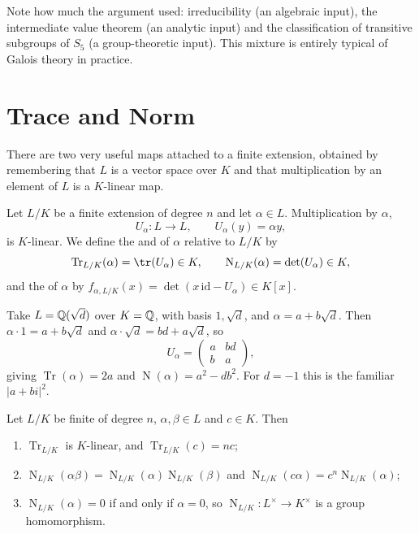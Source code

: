 \documentclass[a4paper]{scrartcl}
\newcommand{\Tr}{\operatorname{Tr}}
\newcommand{\Nm}{\operatorname{N}}
\begin{document}
\begin{remark}
	Note how much the argument used: irreducibility (an algebraic input), the intermediate value theorem (an analytic input) and the classification of transitive subgroups of $S_5$ (a group-theoretic input). This mixture is entirely typical of Galois theory in practice.
\end{remark}

\section{Trace and Norm}\label{sec:tracenorm}

There are two very useful maps attached to a finite extension, obtained by remembering that $L$ is a vector space over $K$ and that multiplication by an element of $L$ is a $K$-linear map.

\begin{definition}
	Let $L/K$ be a finite extension of degree $n$ and let $\alpha \in L$. Multiplication by $\alpha$,
	$$U_\alpha : L \to L, \qquad U_\alpha(y) = \alpha y,$$
	is $K$-linear. We define the  and  of $\alpha$ relative to $L/K$ by
	$$\Tr_{L/K}(\alpha) = \tr(U_\alpha)\in K, \qquad \Nm_{L/K}(\alpha) = \det(U_\alpha)\in K,$$
	and the  of $\alpha$ by $f_{\alpha, L/K}(x) = \det(x\,\mathrm{id} - U_\alpha)\in K[x]$.
\end{definition}

\begin{example}
	Take $L = \mathbb{Q}(\sqrt d)$ over $K = \mathbb{Q}$, with basis $1, \sqrt d$, and $\alpha = a+b\sqrt d$. Then $\alpha\cdot 1 = a + b\sqrt d$ and $\alpha\cdot\sqrt d = bd + a\sqrt d$, so
	$$U_\alpha = \begin{pmatrix} a & bd\\ b& a\end{pmatrix},$$
	giving $\Tr(\alpha) = 2a$ and $\Nm(\alpha) = a^2-db^2$. For $d = -1$ this is the familiar $|a+bi|^2$.
\end{example}

\begin{lemma}\label{lem:tracenormbasic}
	Let $L/K$ be finite of degree $n$, $\alpha,\beta\in L$ and $c \in K$. Then
	\begin{enumerate}[label=(\roman*)]
		\item $\Tr_{L/K}$ is $K$-linear, and $\Tr_{L/K}(c) = nc$;
		\item $\Nm_{L/K}(\alpha\beta) = \Nm_{L/K}(\alpha)\Nm_{L/K}(\beta)$ and $\Nm_{L/K}(c\alpha) = c^n\Nm_{L/K}(\alpha)$;
		\item $\Nm_{L/K}(\alpha) = 0$ if and only if $\alpha = 0$, so $\Nm_{L/K}: L^\times\to K^\times$ is a group homomorphism.
	\end{enumerate}
\end{lemma}
\end{document}
